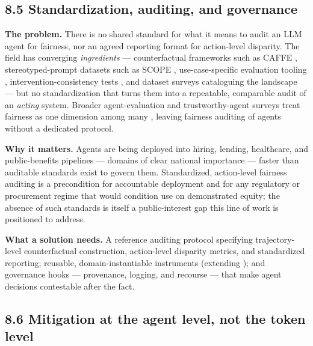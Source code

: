 \documentclass[sigconf,nonacm]{acmart}
\begin{document}
\subsection{8.5 Standardization, auditing, and governance}

\textbf{The problem.} There is no shared standard for what it means to audit an LLM agent for fairness, nor an agreed reporting format for action-level disparity. The field has converging \emph{ingredients} — counterfactual frameworks such as CAFFE \cite{parziale2025systematic}, stereotyped-prompt datasets such as SCOPE \cite{parziale2026scope}, use-case-specific evaluation tooling \cite{bouchard2024bring}, intervention-consistency tests \cite{basu2026names}, and dataset surveys cataloguing the landscape \cite{zhang2025datasets} — but no standardization that turns them into a repeatable, comparable audit of an \emph{acting} system. Broader agent-evaluation and trustworthy-agent surveys treat fairness as one dimension among many \cite{mohammadi2025evaluation,yu2025survey,vatsal2026agentic}, leaving fairness auditing of agents without a dedicated protocol.

\textbf{Why it matters.} Agents are being deployed into hiring, lending, healthcare, and public-benefits pipelines — domains of clear national importance — faster than auditable standards exist to govern them. Standardized, action-level fairness auditing is a precondition for accountable deployment and for any regulatory or procurement regime that would condition use on demonstrated equity; the absence of such standards is itself a public-interest gap this line of work is positioned to address.

\textbf{What a solution needs.} A reference auditing protocol specifying trajectory-level counterfactual construction, action-level disparity metrics, and standardized reporting; reusable, domain-instantiable instruments (extending \cite{parziale2025systematic,parziale2026scope,bouchard2024bring}); and governance hooks — provenance, logging, and recourse — that make agent decisions contestable after the fact.

\subsection{8.6 Mitigation at the agent level, not the token level}
\end{document}
